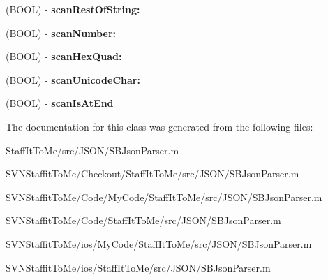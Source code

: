 \begin{DoxyCompactItemize}
\item 
\hypertarget{interface_s_b_json_parser_07_08_a0b251c81dc2753e3330709af36112429}{
(\-B\-O\-O\-L) -\/ {\bfseries scan\-Rest\-Of\-String\-:}}
\label{interface_s_b_json_parser_07_08_a0b251c81dc2753e3330709af36112429}

\item 
\hypertarget{interface_s_b_json_parser_07_08_a40ea5a3426e2af523b6f4355fc41e0e7}{
(\-B\-O\-O\-L) -\/ {\bfseries scan\-Number\-:}}
\label{interface_s_b_json_parser_07_08_a40ea5a3426e2af523b6f4355fc41e0e7}

\item 
\hypertarget{interface_s_b_json_parser_07_08_a940e3c61c38e199844bf1a9fbc41138d}{
(\-B\-O\-O\-L) -\/ {\bfseries scan\-Hex\-Quad\-:}}
\label{interface_s_b_json_parser_07_08_a940e3c61c38e199844bf1a9fbc41138d}

\item 
\hypertarget{interface_s_b_json_parser_07_08_aea014e27d084f4d34e3025089c62aa74}{
(\-B\-O\-O\-L) -\/ {\bfseries scan\-Unicode\-Char\-:}}
\label{interface_s_b_json_parser_07_08_aea014e27d084f4d34e3025089c62aa74}

\item 
\hypertarget{interface_s_b_json_parser_07_08_a968fa7546f80d05c2d3d53fe57a2cece}{
(\-B\-O\-O\-L) -\/ {\bfseries scan\-Is\-At\-End}}
\label{interface_s_b_json_parser_07_08_a968fa7546f80d05c2d3d53fe57a2cece}

\end{DoxyCompactItemize}


\-The documentation for this class was generated from the following files\-:\begin{DoxyCompactItemize}
\item 
\-Staff\-It\-To\-Me/src/\-J\-S\-O\-N/\-S\-B\-Json\-Parser.\-m\item 
\-S\-V\-N\-Staffit\-To\-Me/\-Checkout/\-Staff\-It\-To\-Me/src/\-J\-S\-O\-N/\-S\-B\-Json\-Parser.\-m\item 
\-S\-V\-N\-Staffit\-To\-Me/\-Code/\-My\-Code/\-Staff\-It\-To\-Me/src/\-J\-S\-O\-N/\-S\-B\-Json\-Parser.\-m\item 
\-S\-V\-N\-Staffit\-To\-Me/\-Code/\-Staff\-It\-To\-Me/src/\-J\-S\-O\-N/\-S\-B\-Json\-Parser.\-m\item 
\-S\-V\-N\-Staffit\-To\-Me/ios/\-My\-Code/\-Staff\-It\-To\-Me/src/\-J\-S\-O\-N/\-S\-B\-Json\-Parser.\-m\item 
\-S\-V\-N\-Staffit\-To\-Me/ios/\-Staff\-It\-To\-Me/src/\-J\-S\-O\-N/\-S\-B\-Json\-Parser.\-m\end{DoxyCompactItemize}
